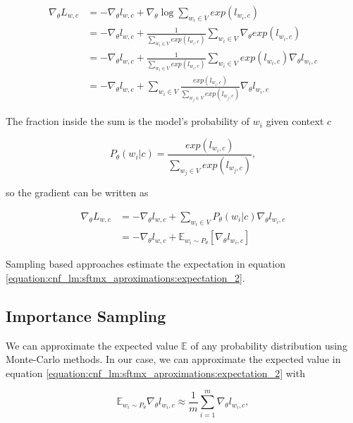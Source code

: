 \begin{align}
    \nabla_\theta L_{w, c} &= - \nabla_\theta l_{w, c} + \nabla_\theta \log \sum_{w_i \in V} exp(l_{w_i,c}) \\
                           &= - \nabla_\theta l_{w, c} + \frac{1}{\sum_{w_i \in V} exp(l_{w_i,c})} \sum_{w_i \in V} \nabla_\theta exp(l_{w_i,c}) \\
                           &= - \nabla_\theta l_{w, c} + \frac{1}{\sum_{w_i \in V} exp(l_{w_i,c})} \sum_{w_i \in V} exp(l_{w_i,c}) \nabla_\theta l_{w_i, c} \\
                           &= - \nabla_\theta l_{w, c} + \sum_{w_i \in V} \frac{exp(l_{w_i,c})}{\sum_{w_j \in V} exp(l_{w_j,c})} \nabla_\theta l_{w_i, c}
\end{align}

The fraction inside the sum is the model's probability of $ w_i $ given context $ c $

\begin{displaymath}
    P_\theta(w_i | c) = \frac{exp(l_{w_i,c})}{\sum_{w_j \in V} exp(l_{w_j,c})},
\end{displaymath}

so the gradient can be written as

\begin{align}
    \label{equation:cnf_lm:sftmx_aproximations:expectation_1}
    \nabla_\theta L_{w, c} &= - \nabla_\theta l_{w, c} + \sum_{w_i \in V}  P_\theta(w_i | c) \nabla_\theta l_{w_i, c} \\
                           \label{equation:cnf_lm:sftmx_aproximations:expectation_2}
                           &= - \nabla_\theta l_{w, c} + \mathbb{E}_{w_i \sim P_\theta} [ \nabla_\theta l_{w_i, c} ]
\end{align}

Sampling based approaches estimate the expectation in equation \ref{equation:cnf_lm:sftmx_aproximations:expectation_2}.

\subsection{Importance Sampling}
We can approximate the expected value $ \mathbb{E} $ of any probability distribution using Monte-Carlo methods. In our case, we can approximate the expected value in equation \ref{equation:cnf_lm:sftmx_aproximations:expectation_2} with

\begin{displaymath}
    \mathbb{E}_{w_i \sim P_\theta} \nabla_\theta l_{w_i, c} \approx \frac{1}{m} \sum_{i=1}^m \nabla_\theta l_{w_i, c},
\end{displaymath}

